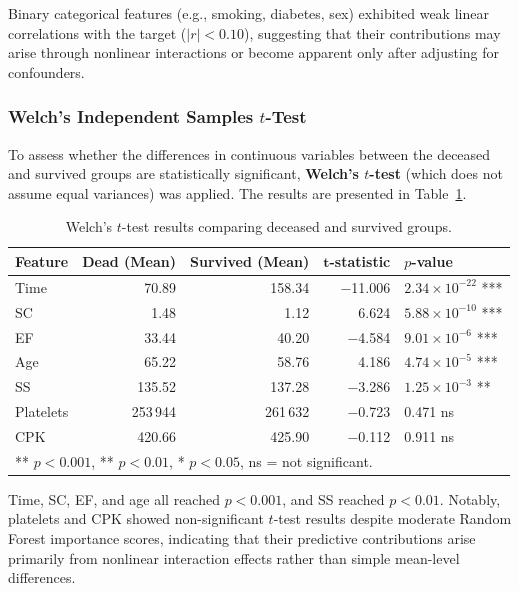 \documentclass[12pt,a4paper]{article}
\begin{document}
Binary categorical features (e.g., smoking, diabetes, sex) exhibited weak linear correlations with the target ($|r| < 0.10$), suggesting that their contributions may arise through nonlinear interactions or become apparent only after adjusting for confounders.

\subsubsection{Welch's Independent Samples $t$-Test}

To assess whether the differences in continuous variables between the deceased and survived groups are statistically significant, \textbf{Welch's $t$-test} (which does not assume equal variances) was applied. The results are presented in Table~\ref{tab:ttest_results}.

\begin{table}[H]
\centering
\caption{Welch's $t$-test results comparing deceased and survived groups.}
\label{tab:ttest_results}
\small
\begin{tabular}{lrrrl}
\toprule
\textbf{Feature} & \textbf{Dead (Mean)} & \textbf{Survived (Mean)} & $\mathbf{t}$\textbf{-statistic} & \textbf{$p$-value} \\
\midrule
Time   & 70.89    & 158.34   & $-$11.006 & $2.34 \times 10^{-22}$ *** \\
SC     & 1.48     & 1.12     & 6.624     & $5.88 \times 10^{-10}$ *** \\
EF     & 33.44    & 40.20    & $-$4.584  & $9.01 \times 10^{-6}$  *** \\
Age    & 65.22    & 58.76    & 4.186     & $4.74 \times 10^{-5}$  *** \\
SS     & 135.52   & 137.28   & $-$3.286  & $1.25 \times 10^{-3}$  **  \\
Platelets & 253\,944 & 261\,632 & $-$0.723 & 0.471 \hspace{1em} ns \\
CPK    & 420.66   & 425.90   & $-$0.112  & 0.911 \hspace{1em} ns \\
\bottomrule
\multicolumn{5}{l}{\footnotesize *** $p<0.001$, ** $p<0.01$, * $p<0.05$, ns = not significant.}
\end{tabular}
\end{table}

Time, SC, EF, and age all reached $p < 0.001$, and SS reached $p < 0.01$. Notably, platelets and CPK showed non-significant $t$-test results despite moderate Random Forest importance scores, indicating that their predictive contributions arise primarily from nonlinear interaction effects rather than simple mean-level differences.
\end{document}
